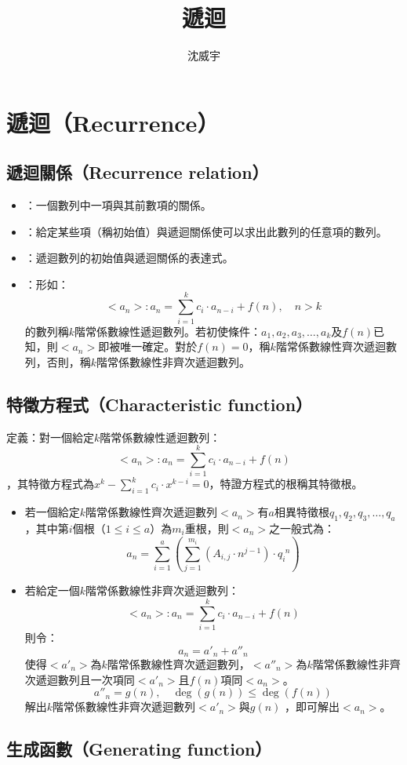 \documentclass[a4paper,12pt]{article}
\begin{document}
\title{遞迴}
\author{沈威宇}
\date{\temtoday}
\titletocdoc
\section{遞迴（Recurrence）}
\subsection{遞迴關係（Recurrence relation）}
\begin{itemize}
\item {}：一個數列中一項與其前數項的關係。
\item {}：給定某些項（稱初始值）與遞迴關係使可以求出此數列的任意項的數列。
\item {}：遞迴數列的初始值與遞迴關係的表達式。
\item {}：形如：
\[<a_n>\colon a_n=\sum_{i=1}^k c_i \cdot a_{n-i} + f(n),\quad n>k\]
的數列稱$k$階常係數線性遞迴數列。若初使條件：$a_1, a_2, a_3, \ldots, a_k$及$f(n)$已知，則$<a_n>$即被唯一確定。對於$f(n)=0$，稱$k$階常係數線性齊次遞迴數列，否則，稱$k$階常係數線性非齊次遞迴數列。
\end{itemize}
\subsection{特徵方程式（Characteristic function）}
定義：對一個給定$k$階常係數線性遞迴數列：
\[<a_n>: a_n=\sum_{i=1}^k c_i \cdot a_{n-i} + f(n)\]
，其特徵方程式為$x^k-\sum_{i=1}^k c_i \cdot x^{k-i}=0$，特證方程式的根稱其特徵根。
\begin{itemize}
\item 若一個給定$k$階常係數線性齊次遞迴數列$<a_n>$有$a$相異特徵根$q_1, q_2, q_3, \ldots, q_a$，其中第$i$個根（$1\leq i\leq a$）為$m_i$重根，則$<a_n>$之一般式為：
\[a_n=\sum_{i=1}^{a} \left( \sum_{j=1}^{m_i} \left(A_{i,j}\cdot n^{j-1}\right) \cdot q_i^{\phantom{i}n} \right)\]
\item 若給定一個$k$階常係數線性非齊次遞迴數列：
\[<a_n>: a_n=\sum_{i=1}^k c_i \cdot a_{n-i} + f(n)\]
則令：
\[a_n = a'_n+a''_n \]
使得$<a'_n>$為$k$階常係數線性齊次遞迴數列，$<a''_n>$為$k$階常係數線性非齊次遞迴數列且一次項同$<a'_n>$且$f(n)$項同$<a_n>$。
\[a''_n = g(n),\quad\deg(g(n))\leq \deg(f(n))\]
解出$k$階常係數線性非齊次遞迴數列$<a'_n>$與$g(n)$ ，即可解出$<a_n>$。
\end{itemize}
\subsection{生成函數（Generating function）}
\end{document}
